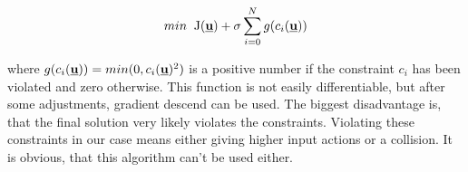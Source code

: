 \documentclass{article}
\newcommand{\uvec}{\textbf{\underline{u}}}
\begin{document}
\begin{equation}
min\;\;\mathrm{J}(\uvec) + \sigma\sum_{i = 0}^N g(c_i(\uvec))
\end{equation}

where $g(c_i(\uvec)) = min(0, c_i(\uvec)^2)$ is a positive number if the constraint $c_i$ has been violated and zero otherwise. This function is not easily differentiable, but after some adjustments, gradient descend can be used. The biggest disadvantage is, that the final solution very likely violates the constraints. Violating these constraints in our case means either giving higher input actions or a collision. It is obvious, that this algorithm can't be used either.  
\end{document}
